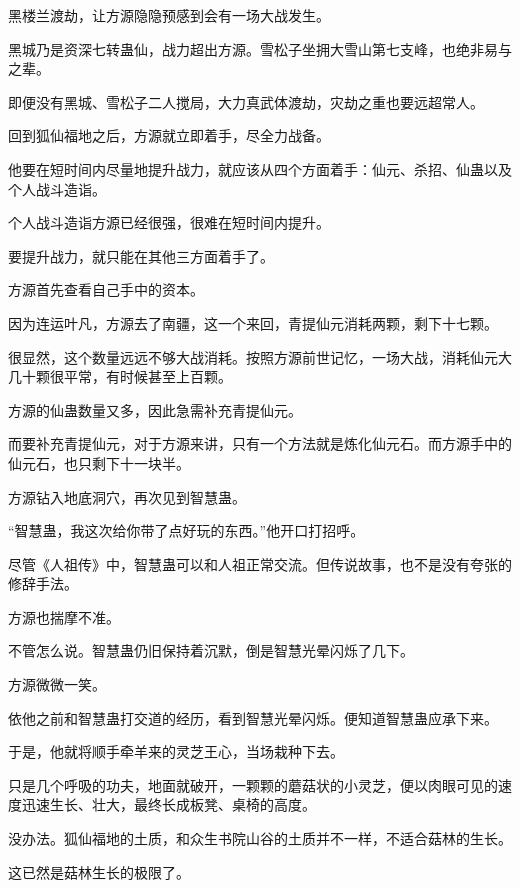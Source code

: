 
\begin{this_body}



黑楼兰渡劫，让方源隐隐预感到会有一场大战发生。

黑城乃是资深七转蛊仙，战力超出方源。雪松子坐拥大雪山第七支峰，也绝非易与之辈。

即便没有黑城、雪松子二人搅局，大力真武体渡劫，灾劫之重也要远超常人。

回到狐仙福地之后，方源就立即着手，尽全力战备。

他要在短时间内尽量地提升战力，就应该从四个方面着手：仙元、杀招、仙蛊以及个人战斗造诣。

个人战斗造诣方源已经很强，很难在短时间内提升。

要提升战力，就只能在其他三方面着手了。

方源首先查看自己手中的资本。

因为连运叶凡，方源去了南疆，这一个来回，青提仙元消耗两颗，剩下十七颗。

很显然，这个数量远远不够大战消耗。按照方源前世记忆，一场大战，消耗仙元大几十颗很平常，有时候甚至上百颗。

方源的仙蛊数量又多，因此急需补充青提仙元。

而要补充青提仙元，对于方源来讲，只有一个方法就是炼化仙元石。而方源手中的仙元石，也只剩下十一块半。

方源钻入地底洞穴，再次见到智慧蛊。

“智慧蛊，我这次给你带了点好玩的东西。”他开口打招呼。

尽管《人祖传》中，智慧蛊可以和人祖正常交流。但传说故事，也不是没有夸张的修辞手法。

方源也揣摩不准。

不管怎么说。智慧蛊仍旧保持着沉默，倒是智慧光晕闪烁了几下。

方源微微一笑。

依他之前和智慧蛊打交道的经历，看到智慧光晕闪烁。便知道智慧蛊应承下来。

于是，他就将顺手牵羊来的灵芝王心，当场栽种下去。

只是几个呼吸的功夫，地面就破开，一颗颗的蘑菇状的小灵芝，便以肉眼可见的速度迅速生长、壮大，最终长成板凳、桌椅的高度。

没办法。狐仙福地的土质，和众生书院山谷的土质并不一样，不适合菇林的生长。

这已然是菇林生长的极限了。


\end{this_body}
